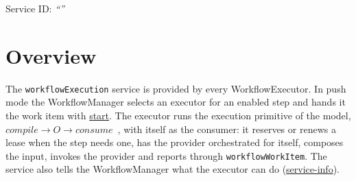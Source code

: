 \documentclass[a4paper]{arrowhead}
\newcommand{\oref}[1]{{\textcolor{ArrowheadBlue}{\hyperref[sec:operations:#1]{#1}}}}
\begin{document}
\ArrowheadSetup

\begin{center}
  \vspace*{1cm}
  \huge{\arrowtitle}

  \vspace*{0.2cm}
  \LARGE{\arrowtype}
  \vspace*{1cm}

  \Large{Service ID: \textit{``\arrowid''}}
  \vspace*{\fill}

  

  \vspace*{1cm}
  \vspace*{\fill}

  \begin{abstract}
    This document describes the \texttt{workflowExecution} service of the Eclipse Arrowhead workflow support systems, which runs work items on behalf of a WorkflowManager. It is provided by the WorkflowExecutor system, service version 1.0.0, documentation edition 5.4.0.
  \end{abstract}

  \vspace*{1cm}
\end{center}

\newpage

\tableofcontents
\newpage

\section{Overview}
\label{sec:overview}
The \texttt{workflowExecution} service is provided by every WorkflowExecutor. In push mode the
WorkflowManager selects an executor for an enabled step and hands it the work item with \oref{start}. The executor
runs the execution primitive of the model, $compile \rightarrow O \rightarrow consume$~\cite{varga2026}, with itself
as the consumer: it reserves or renews a lease when the step needs one, has the provider orchestrated for itself,
composes the input, invokes the provider and reports through \texttt{workflowWorkItem}. The service also tells the
WorkflowManager what the executor can do (\oref{service-info}).
\end{document}
